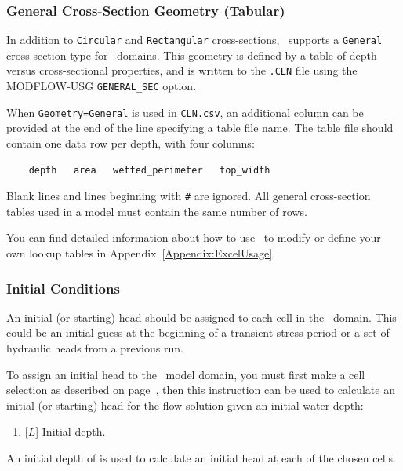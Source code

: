 \subsubsection{General Cross-Section Geometry (Tabular)} 
In addition to \texttt{Circular} and \texttt{Rectangular} cross-sections, \mut\ supports a \texttt{General} cross-section type for \cln\ domains.
This geometry is defined by a table of depth versus cross-sectional properties, and is written to the \texttt{.CLN} file using the MODFLOW-USG \texttt{GENERAL\_SEC} option.

When \texttt{Geometry=General} is used in \texttt{CLN.csv}, an additional column can be provided at the end of the line specifying a table file name.
The table file should contain one data row per depth, with four columns:
\begin{verbatim}
    depth   area   wetted_perimeter   top_width
\end{verbatim}
Blank lines and lines beginning with \texttt{\#} are ignored.
All general cross-section tables used in a model must contain the same number of rows.

You can find detailed information about how to use \excel\ to modify or define your own lookup tables in Appendix~\ref{Appendix:ExcelUsage}.

\subsubsection{Initial Conditions}  
An initial (or starting) head should be assigned to each cell in the \cln\ domain.  This could be an initial guess at the beginning of a transient stress period or a set of hydraulic heads from a previous run.

To assign an initial head to the \cln\ model domain, you must first make a cell selection as described on page~\pageref{page:cellSelect}, then this instruction can be used to calculate an initial (or starting) head for the flow solution given an initial water depth:

    {
        \squish
        \begin{enumerate}
        \item {} [$L$]  Initial depth.
        \end{enumerate}
          An initial depth of  is used to calculate an initial head at each of the chosen cells.
    }

